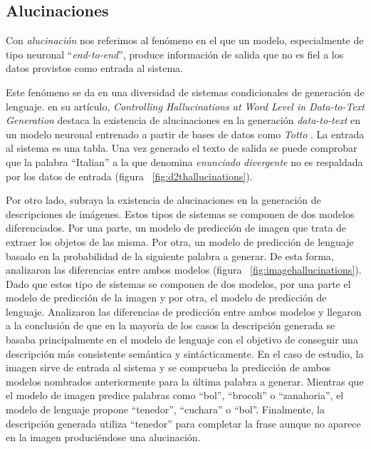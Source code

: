 \subsection{Alucinaciones}

Con \textit{alucinación} nos referimos al fenómeno en el que un modelo, especialmente de tipo neuronal ``\textit{end-to-end}'', produce información de salida que no es fiel a los datos provistos como entrada al sistema. 

Este fenómeno se da en una diversidad de sistemas condicionales de generación de lenguaje. \cite{hallucinations_data2text} en su artículo, \textit{Controlling Hallucinations at Word Level in Data-to-Text Generation} destaca la existencia de alucinaciones en la generación \textit{data-to-text} en un modelo neuronal entrenado a partir de bases de datos como \textit{Totto} \citep{parikh-etal-2020-totto}. La entrada al sistema es una tabla. Una vez generado el texto de salida se puede comprobar que la palabra ``Italian'' a la que denomina \textit{enunciado divergente} no es respaldada por los datos de entrada (figura ~\ref{fig:d2thallucinations}).

Por otro lado, \cite{rohrbach-etal-2018-object} subraya la existencia de alucinaciones en la generación de descripciones de imágenes. Estos tipos de sistemas se componen de dos modelos diferenciados. Por una parte, un modelo de predicción de imagen que trata de extraer los objetos de las misma. Por otra, un modelo de predicción de lenguaje basado en la probabilidad de la siguiente palabra a generar. De esta forma, analizaron las diferencias entre ambos modelos (figura ~\ref{fig:imagehallucinations}). Dado que estos tipo de sistemas se componen de dos modelos, por una parte el modelo de predicción de la imagen y por otra, el modelo de predicción de lenguaje. Analizaron las diferencias de predicción entre ambos modelos y llegaron a la conclusión de que en la mayoría de los casos la descripción generada se basaba principalmente en el modelo de lenguaje con el objetivo de conseguir una descripción más consistente semántica y sintácticamente. En el caso de estudio, la imagen sirve de entrada al sistema y se comprueba la predicción de ambos modelos nombrados anteriormente para la última palabra a generar. Mientras que el modelo de imagen predice palabras como ``bol'', ``brocoli'' o ``zanahoria'', el modelo de lenguaje propone ``tenedor'', ``cuchara'' o ``bol''. Finalmente, la descripción generada utiliza ``tenedor'' para completar la frase aunque no aparece en la imagen produciéndose una alucinación.


